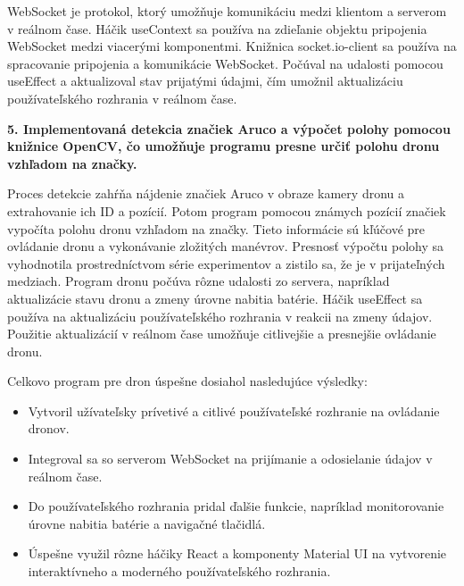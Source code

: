 WebSocket je protokol, ktorý umožňuje komunikáciu medzi klientom a serverom v reálnom čase.
Háčik useContext sa používa na zdieľanie objektu pripojenia WebSocket medzi viacerými komponentmi.
Knižnica socket.io-client sa používa na spracovanie pripojenia a komunikácie WebSocket.
Počúval na udalosti pomocou useEffect a aktualizoval stav prijatými údajmi, čím umožnil aktualizáciu používateľského rozhrania v reálnom čase.

\textbf{5. Implementovaná detekcia značiek Aruco a výpočet polohy pomocou knižnice OpenCV, čo umožňuje programu presne určiť polohu dronu vzhľadom na značky.}

Proces detekcie zahŕňa nájdenie značiek Aruco v obraze kamery dronu a extrahovanie ich ID a pozícií. Potom program pomocou známych pozícií značiek vypočíta polohu dronu vzhľadom na značky. Tieto informácie sú kľúčové pre ovládanie dronu a vykonávanie zložitých manévrov. Presnosť výpočtu polohy sa vyhodnotila prostredníctvom série experimentov a zistilo sa, že je v prijateľných medziach.
Program dronu počúva rôzne udalosti zo servera, napríklad aktualizácie stavu dronu a zmeny úrovne nabitia batérie.
Háčik useEffect sa používa na aktualizáciu používateľského rozhrania v reakcii na zmeny údajov.
Použitie aktualizácií v reálnom čase umožňuje citlivejšie a presnejšie ovládanie dronu.

Celkovo program pre dron úspešne dosiahol nasledujúce výsledky:

\begin{itemize}
        \item Vytvoril užívateľsky prívetivé a citlivé používateľské rozhranie na ovládanie dronov.
        \item Integroval sa so serverom WebSocket na prijímanie a odosielanie údajov v reálnom čase.
        \item Do používateľského rozhrania pridal ďalšie funkcie, napríklad monitorovanie úrovne nabitia batérie a navigačné tlačidlá.
        \item Úspešne využil rôzne háčiky React a komponenty Material UI na vytvorenie interaktívneho a moderného používateľského rozhrania.
\end{itemize}


